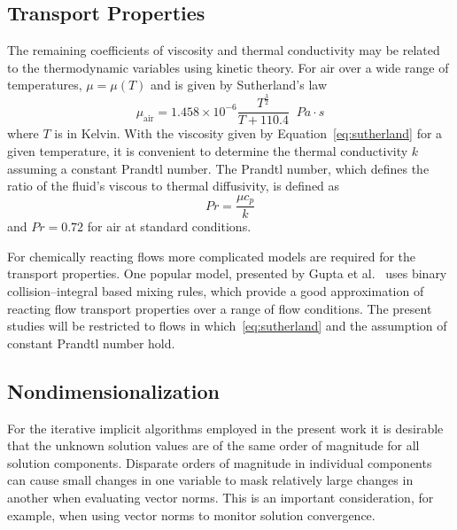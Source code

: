 \subsection{Transport Properties}
The remaining coefficients of viscosity and thermal conductivity may be related to the thermodynamic variables using kinetic theory.  For air over a wide range of temperatures, $\mu=\mu(T)$ and is given by Sutherland's law~\cite{white_viscous_fluid_flow}
\begin{equation}
  \label{eq:sutherland}
  \mu_\text{air} =  1.458\times10^{-6}\frac{T^\frac{3}{2}}{T + 110.4}\;\; \unit{Pa\cdot s}
\end{equation}
where $T$ is in Kelvin.  With the viscosity given by Equation~\eqref{eq:sutherland} for a given temperature, it is convenient to determine the thermal conductivity $k$ assuming a constant Prandtl number.  The Prandtl number, which defines the ratio of the fluid's viscous to thermal diffusivity, is defined as
\begin{equation}
  \label{eq:prandtl}
  Pr = \frac{\mu c_p}{k}
\end{equation}
and $Pr=0.72$ for air at standard conditions.

For chemically reacting flows more complicated models are required for the transport properties.  One popular model, presented by Gupta et al.~\cite{gupta_transport} uses binary collision--integral based mixing rules, which provide a good approximation of reacting flow transport properties over a range of flow conditions.  The present studies will be restricted to flows in which~\eqref{eq:sutherland} and the assumption of constant Prandtl number hold.



\subsection{Nondimensionalization}
For the iterative implicit algorithms employed in the present work it is desirable that the unknown solution values are of the same order of magnitude for all solution components.  Disparate orders of magnitude in individual components can cause small changes in one variable to mask relatively large changes in another when evaluating vector norms. This is an important consideration, for example, when using vector norms to monitor solution convergence.

